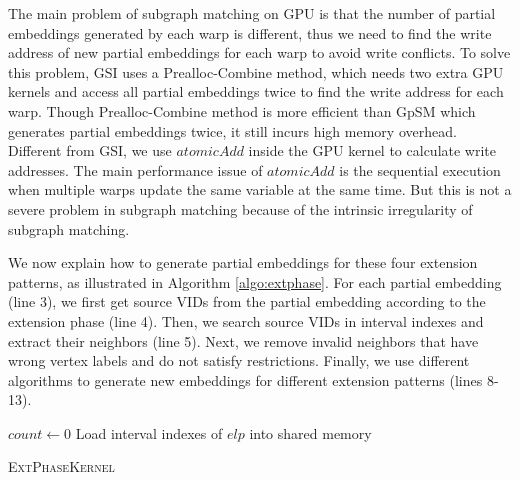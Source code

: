 The main problem of subgraph matching on GPU is that the number of partial embeddings generated by each warp is different, thus we need to find the write address of new partial embeddings for each warp to avoid write conflicts. To solve this problem, GSI \cite{zeng2020gsi} uses a Prealloc-Combine method, which needs two extra GPU kernels and access all partial embeddings twice to find the write address for each warp. Though Prealloc-Combine method is more efficient than GpSM \cite{tran2015fast} which generates partial embeddings twice, it still incurs high memory overhead. Different from GSI, we use $atomicAdd$ inside the GPU kernel to calculate write addresses. The main performance issue of $atomicAdd$ is the sequential execution when multiple warps update the same variable at the same time. But this is not a severe problem in subgraph matching because of the intrinsic irregularity of subgraph matching.

We now explain how to generate partial embeddings for these four extension patterns, as illustrated in Algorithm \ref{algo:extphase}. For each partial embedding (line 3), we first get source VIDs from the partial embedding according to the extension phase (line 4). Then, we search source VIDs in interval indexes and extract their neighbors (line 5).  Next, we remove invalid neighbors that have wrong vertex labels and do not satisfy restrictions. Finally, we use different algorithms to generate new embeddings for different extension patterns (lines 8-13).

\begin{algorithm}
$count \leftarrow 0$\;
Load interval indexes of $elp$ into shared memory\;

\caption{\textsc{ExtPhaseKernel}}
\label{algo:extphase}
\end{algorithm}

